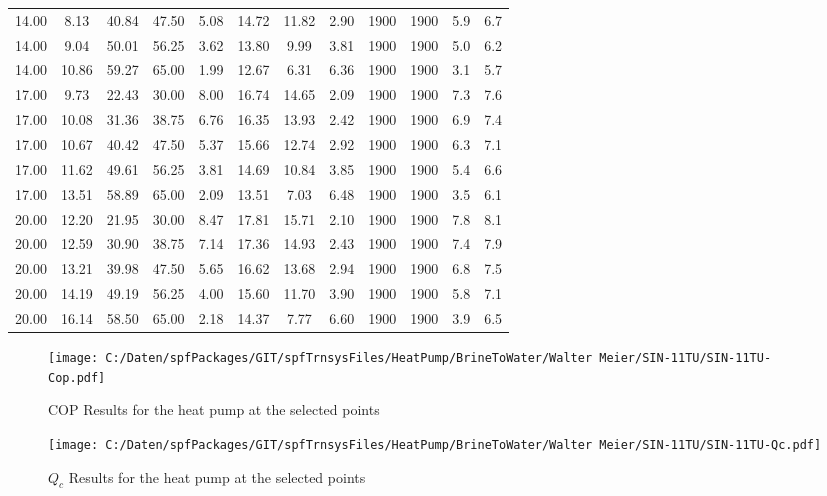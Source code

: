 \documentclass[english]{SPFShortReport}
\begin{document}
\begin{table}[!ht]
\begin{small}
\begin{center}
{\begin{tabular}{l | c c c c c c c c c c c }
14.00 & 8.13 & 40.84 & 47.50 & 5.08 & 14.72 & 11.82 & 2.90 & 1900 & 1900 & 5.9 & 6.7\\ 
14.00 & 9.04 & 50.01 & 56.25 & 3.62 & 13.80 & 9.99 & 3.81 & 1900 & 1900 & 5.0 & 6.2\\ 
14.00 & 10.86 & 59.27 & 65.00 & 1.99 & 12.67 & 6.31 & 6.36 & 1900 & 1900 & 3.1 & 5.7\\ 
17.00 & 9.73 & 22.43 & 30.00 & 8.00 & 16.74 & 14.65 & 2.09 & 1900 & 1900 & 7.3 & 7.6\\ 
17.00 & 10.08 & 31.36 & 38.75 & 6.76 & 16.35 & 13.93 & 2.42 & 1900 & 1900 & 6.9 & 7.4\\ 
17.00 & 10.67 & 40.42 & 47.50 & 5.37 & 15.66 & 12.74 & 2.92 & 1900 & 1900 & 6.3 & 7.1\\ 
17.00 & 11.62 & 49.61 & 56.25 & 3.81 & 14.69 & 10.84 & 3.85 & 1900 & 1900 & 5.4 & 6.6\\ 
17.00 & 13.51 & 58.89 & 65.00 & 2.09 & 13.51 & 7.03 & 6.48 & 1900 & 1900 & 3.5 & 6.1\\ 
20.00 & 12.20 & 21.95 & 30.00 & 8.47 & 17.81 & 15.71 & 2.10 & 1900 & 1900 & 7.8 & 8.1\\ 
20.00 & 12.59 & 30.90 & 38.75 & 7.14 & 17.36 & 14.93 & 2.43 & 1900 & 1900 & 7.4 & 7.9\\ 
20.00 & 13.21 & 39.98 & 47.50 & 5.65 & 16.62 & 13.68 & 2.94 & 1900 & 1900 & 6.8 & 7.5\\ 
20.00 & 14.19 & 49.19 & 56.25 & 4.00 & 15.60 & 11.70 & 3.90 & 1900 & 1900 & 5.8 & 7.1\\ 
20.00 & 16.14 & 58.50 & 65.00 & 2.18 & 14.37 & 7.77 & 6.60 & 1900 & 1900 & 3.9 & 6.5\\ 
\hline
\hline
\end{tabular}
}
\label{ResultsTable}
\end{center}
\end{small}
\end{table}
\begin{figure}[!ht]
\begin{center}
\texttt{[image: C:/Daten/spfPackages/GIT/spfTrnsysFiles/HeatPump/BrineToWater/Walter Meier/SIN-11TU/SIN-11TU-Cop.pdf]}
\caption{COP Results for the heat pump at the selected points}
\label{COPFig}
\end{center}
\end{figure}
\begin{figure}[!ht]
\begin{center}
\texttt{[image: C:/Daten/spfPackages/GIT/spfTrnsysFiles/HeatPump/BrineToWater/Walter Meier/SIN-11TU/SIN-11TU-Qc.pdf]}
\caption{$Q_c$ Results for the heat pump at the selected points}
\label{QcFig}
\end{center}
\end{figure}
\end{document}
